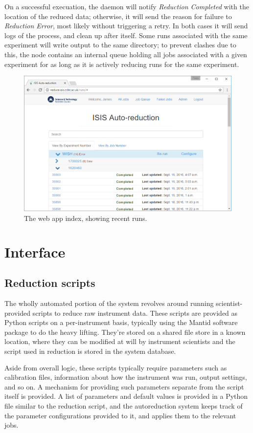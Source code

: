\documentclass[twocolumn]{article}
\begin{document}
On a successful execuation, the daemon will notify \emph{Reduction Completed} with
the location of the reduced data; otherwise, it will send the reason for
failure to \emph{Reduction Error}, most likely without triggering a
retry. In both cases it will send logs of the process, and clean up
after itself. Some runs associated with the same experiment will write
output to the same directory; to prevent clashes due to this, the node
contains an internal queue holding all jobs associated with a given
experiment for as long as it is actively reducing runs for the
same experiment.


\begin{figure}
\centering\includegraphics[width=0.8\linewidth]{index.png}
\caption{The web app index, showing recent runs.}
\end{figure}

\section{Interface}\label{interface}

\subsection{Reduction scripts}\label{reduction-scripts}

The wholly automated portion of the system revolves around running
scientist-provided scripts to reduce raw instrument data. These scripts
are provided as Python scripts on a per-instrument basis, typically
using the Mantid software package to do the heavy lifting. They're
stored on a shared file store in a known location, where they can be
modified at will by instrument scientists and the script used in
reduction is stored in the system database.

Aside from overall logic, these scripts typically require parameters
such as calibration files, information about how the instrument was run,
output settings, and so on. A mechanism for providing such parameters 
separate from the script itself is provided. A list of parameters and
default values is provided in a Python file similar to the reduction
script, and the autoreduction system keeps track of the parameter
configurations provided to it, and applies them to the relevant jobs.
\end{document}
